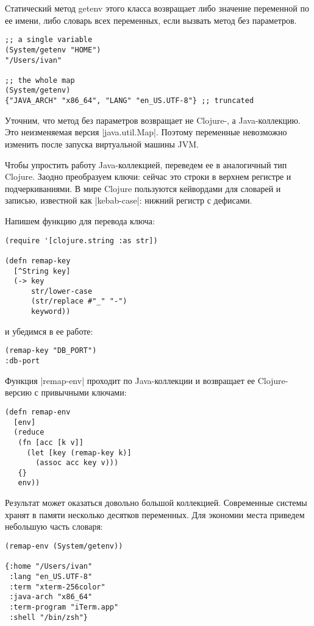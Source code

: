 Статический метод getenv этого класса возвращает либо значение переменной по ее
имени, либо словарь всех переменных, если вызвать метод без параметров.

\begin{verbatim}
;; a single variable
(System/getenv "HOME")
"/Users/ivan"

;; the whole map
(System/getenv)
{"JAVA_ARCH" "x86_64", "LANG" "en_US.UTF-8"} ;; truncated
\end{verbatim}

Уточним, что метод без параметров возвращает не Clojure-, а Java-коллекцию. Это
неизменяемая версия \spverb|java.util.Map|. Поэтому переменные невозможно изменить
после запуска виртуальной машины JVM.

Чтобы упростить работу Java-коллекцией, переведем ее в аналогичный тип
Clojure. Заодно преобразуем ключи: сейчас это строки в верхнем регистре и
подчеркиваниями. В мире Clojure пользуются кейвордами для словарей и записью,
известной как \spverb|kebab-case|: нижний регистр с дефисами.

Напишем функцию для перевода ключа:

\begin{verbatim}
(require '[clojure.string :as str])

(defn remap-key
  [^String key]
  (-> key
      str/lower-case
      (str/replace #"_" "-")
      keyword))
\end{verbatim}

и убедимся в ее работе:

\begin{verbatim}
(remap-key "DB_PORT")
:db-port
\end{verbatim}

Функция \spverb|remap-env| проходит по Java-коллекции и возвращает ее Clojure-версию с
привычными ключами:

\begin{verbatim}
(defn remap-env
  [env]
  (reduce
   (fn [acc [k v]]
     (let [key (remap-key k)]
       (assoc acc key v)))
   {}
   env))
\end{verbatim}

Результат может оказаться довольно большой коллекцией. Современные системы
хранят в памяти несколько десятков переменных. Для экономии места приведем
небольшую часть словаря:

\begin{verbatim}
(remap-env (System/getenv))

{:home "/Users/ivan"
 :lang "en_US.UTF-8"
 :term "xterm-256color"
 :java-arch "x86_64"
 :term-program "iTerm.app"
 :shell "/bin/zsh"}
\end{verbatim}

